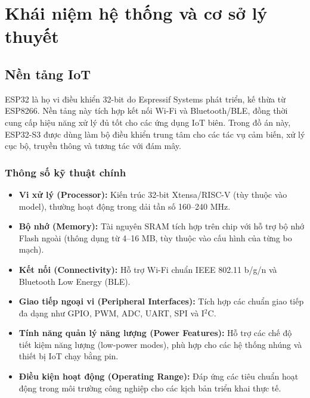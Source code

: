 \newpage
\section{Khái niệm hệ thống và cơ sở lý thuyết}
\subsection{Nền tảng IoT}
ESP32 là họ vi điều khiển 32-bit do Espressif Systems phát triển, kế thừa từ ESP8266. Nền tảng này tích hợp kết nối Wi-Fi và Bluetooth/BLE, đồng thời cung cấp hiệu năng xử lý đủ tốt cho các ứng dụng IoT biên. Trong đồ án này, ESP32-S3 được dùng làm bộ điều khiển trung tâm cho các tác vụ cảm biến, xử lý cục bộ, truyền thông và tương tác với đám mây.

\subsubsection{Thông số kỹ thuật chính}
\begin{itemize}
    \item \textbf{Vi xử lý (Processor):} Kiến trúc 32-bit Xtensa/RISC-V (tùy thuộc vào model), thường hoạt động trong dải tần số 160--240 MHz.
    \item \textbf{Bộ nhớ (Memory):} Tài nguyên SRAM tích hợp trên chip với hỗ trợ bộ nhớ Flash ngoài (thông dụng từ 4--16 MB, tùy thuộc vào cấu hình của từng bo mạch).
    \item \textbf{Kết nối (Connectivity):} Hỗ trợ Wi-Fi chuẩn IEEE 802.11 b/g/n và Bluetooth Low Energy (BLE).
    \item \textbf{Giao tiếp ngoại vi (Peripheral Interfaces):} Tích hợp các chuẩn giao tiếp đa dạng như GPIO, PWM, ADC, UART, SPI và I$^2$C.
    \item \textbf{Tính năng quản lý năng lượng (Power Features):} Hỗ trợ các chế độ tiết kiệm năng lượng (low-power modes), phù hợp cho các hệ thống nhúng và thiết bị IoT chạy bằng pin.
    \item \textbf{Điều kiện hoạt động (Operating Range):} Đáp ứng các tiêu chuẩn hoạt động trong môi trường công nghiệp cho các kịch bản triển khai thực tế.
\end{itemize}


